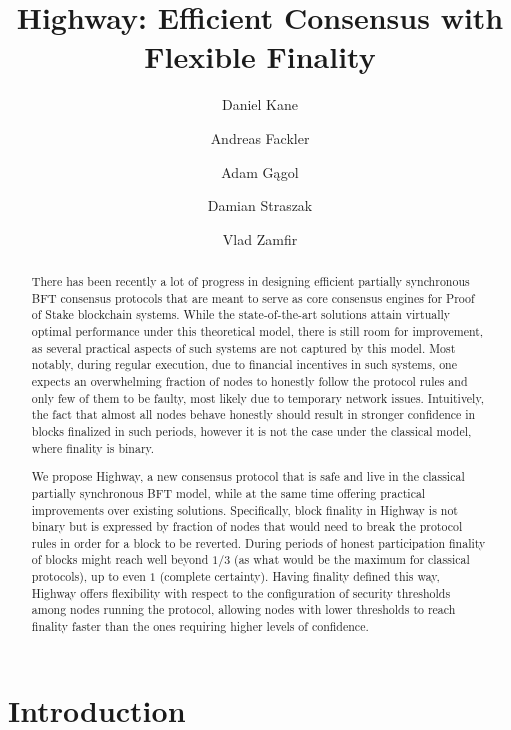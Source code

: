 \documentclass[12pt, fleqn]{article}
\title{Highway: Efficient Consensus with Flexible Finality}
\author[1]{Daniel Kane}
\author[2]{Andreas Fackler}
\author[3]{Adam Gągol}
\author[4]{Damian Straszak}
\author[5]{Vlad Zamfir}
\affil[1]{Computer Science and Engineering Department, UC San Diego}
\affil[2]{CasperLabs LLC}
\affil[3,4]{Cardinal Cryptography}
\affil[5]{Ethereum Research}
\begin{document}
\maketitle

\begin{abstract}
There has been recently a lot of progress in designing efficient partially synchronous BFT consensus protocols that are meant to serve as core consensus engines for Proof of Stake blockchain systems.
% 
While the state-of-the-art solutions attain virtually optimal performance under this theoretical model, there is still room for improvement, as several practical aspects of such systems are not captured by this model.
%
Most notably, during regular execution, due to financial incentives in such systems, one expects an overwhelming fraction of nodes to honestly follow the protocol rules and only few of them to be faulty, most likely due to temporary network issues.
%
Intuitively, the fact that almost all nodes behave honestly should result in stronger confidence in blocks finalized in such periods, however it is not the case under the classical model, where finality is binary.
%

We propose Highway, a new consensus protocol that is safe and live in the classical partially synchronous BFT model, while at the same time offering practical improvements over existing solutions.
%
Specifically, block finality in Highway is not binary but is expressed by fraction of nodes that would need to break the protocol rules in order for a block to be reverted.
%
During periods of honest participation finality of blocks might reach well beyond $1/3$ (as what would be the maximum for classical protocols), up to even $1$ (complete certainty).
%
Having finality defined this way, Highway offers flexibility with respect to the configuration of security thresholds among nodes running the protocol, allowing nodes with lower thresholds to reach finality faster than the ones requiring higher levels of confidence.

\end{abstract}

\section{Introduction}
\end{document}

